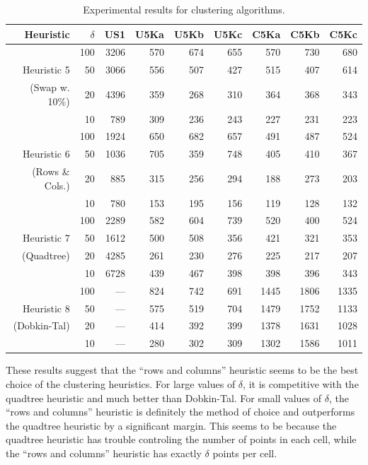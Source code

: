 \documentclass{elsart}
\begin{document}
 
\begin{table}
\begin{center}\begin{tabular}{|r|r|r|rrr|rrr|}\hline\hline
Heuristic  & $\delta$ 
                 &  US1 & U5Ka & U5Kb & U5Kc & C5Ka & C5Kb & C5Kc\\\hline 
           & 100 & 3206 &  570 &  674 &  655 &  570 &  730 &  680 \\
Heuristic 5&  50 & 3066 &  556 &  507 &  427 &  515 &  407 &  614 \\
(Swap w. 10\%)&20&4396& 359 &  268 &  310 &  364 &  368 &  343 \\ 
           &  10 &  789 &  309 &  236 &  243 &  227 &  231 &  223 \\\hline
           & 100 & 1924 &  650 &  682 &  657 &  491 &  487 &  524 \\
Heuristic 6&  50 & 1036 &  705 &  359 &  748 &  405 &  410 &  367 \\
(Rows \& Cols.)&20&885 &  315 &  256 &  294 &  188 &  273 &  203 \\
           &  10 &  780 &  153 &  195 &  156 &  119 &  128 &  132 \\\hline
           & 100 & 2289 &  582 &  604 &  739 &  520 &  400 &  524 \\
Heuristic 7&  50 & 1612 &  500 &  508 &  356 &  421 &  321 &  353 \\
(Quadtree) &  20 & 4285 &  261 &  230 &  276 &  225 &  217 &  207 \\
           &  10 & 6728 &  439 &  467 &  398 &  398 &  396 &  343 \\\hline
           &  100&  --- &  824 &  742 &  691 & 1445 & 1806 & 1335 \\
Heuristic 8&  50 &  --- &  575 &  519 &  704 & 1479 & 1752 & 1133 \\
(Dobkin-Tal)& 20 &  --- &  414 &  392 &  399 & 1378 & 1631 & 1028 \\
           &  10 &  --- &  280 &  302 &  309 & 1302 & 1586 & 1011 \\ \hline
\end{tabular}\end{center}
\caption{Experimental results for clustering algorithms.}
\label{tab:results}
\end{table}

These results suggest that the ``rows and columns'' heuristic seems to
be the best choice of the clustering heuristics.  For large values of
$\delta$, it is competitive with the quadtree heuristic and much
better than Dobkin-Tal.  For small values of $\delta$, the ``rows and
columns'' heuristic is definitely the method of choice and outperforms
the quadtree heuristic by a significant margin.  This seems to be
because the quadtree heuristic has trouble controling the number of
points in each cell, while the ``rows and columns'' heuristic has
exactly $\delta$ points per cell.
\end{document}
